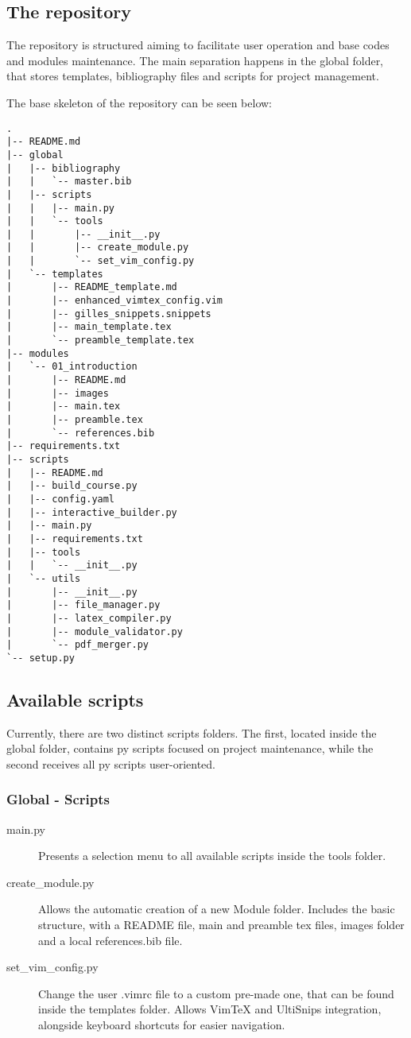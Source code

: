 \documentclass[a4paper,11pt]{article}
\begin{document}
\subsection{The repository}
The repository is structured aiming to facilitate user operation and base codes
and modules maintenance. The main separation happens in the global folder, that
stores templates, bibliography files and scripts for project management.\par
The base skeleton of the repository can be seen below:\par
\begin{verbatim}
.
|-- README.md
|-- global
|   |-- bibliography
|   |   `-- master.bib
|   |-- scripts
|   |   |-- main.py
|   |   `-- tools
|   |       |-- __init__.py
|   |       |-- create_module.py
|   |       `-- set_vim_config.py
|   `-- templates
|       |-- README_template.md
|       |-- enhanced_vimtex_config.vim
|       |-- gilles_snippets.snippets
|       |-- main_template.tex
|       `-- preamble_template.tex
|-- modules
|   `-- 01_introduction
|       |-- README.md
|       |-- images
|       |-- main.tex
|       |-- preamble.tex
|       `-- references.bib
|-- requirements.txt
|-- scripts
|   |-- README.md
|   |-- build_course.py
|   |-- config.yaml
|   |-- interactive_builder.py
|   |-- main.py
|   |-- requirements.txt
|   |-- tools
|   |   `-- __init__.py
|   `-- utils
|       |-- __init__.py
|       |-- file_manager.py
|       |-- latex_compiler.py
|       |-- module_validator.py
|       `-- pdf_merger.py
`-- setup.py
\end{verbatim}
\subsection{Available scripts}
Currently, there are two distinct scripts folders. The first, located inside the
global folder, contains py scripts focused on project maintenance, while the
second receives all py scripts user-oriented.
\subsubsection{Global - Scripts}
\begin{description}
    \item[main.py] Presents a selection menu to all available scripts inside the
        tools folder.
    \item[create\_module.py] Allows the automatic creation of a new Module
        folder. Includes the basic structure, with a README file, main and
        preamble tex files, images folder and a local references.bib file.
    \item[set\_vim\_config.py] Change the user .vimrc file to a custom pre-made
        one, that can be found inside the templates folder. Allows VimTeX
        and UltiSnips integration, alongside keyboard shortcuts for easier
        navigation.
\end{description}
\end{document}
